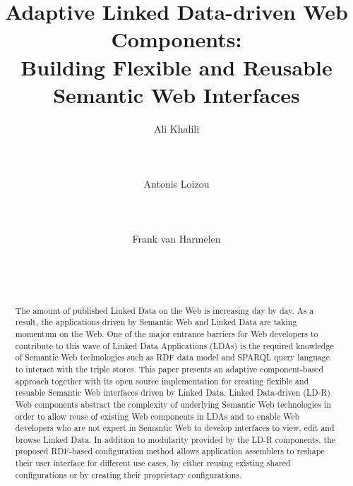 \documentclass{acm_proc_article-sp}
\begin{document}
\title{Adaptive Linked Data-driven Web Components:\\ Building Flexible and Reusable Semantic Web Interfaces}
\subtitle{}

\author{
\alignauthor
Ali Khalili\\
       \\
       \\
       \\
\alignauthor
Antonis Loizou\\
       \\
       \\
       \\
\alignauthor
Frank van Harmelen\\
       \\
       \\
       \\
}


\maketitle
\begin{abstract}
The amount of published Linked Data on the Web is increasing day by day.
As a result, the applications driven by Semantic Web and Linked Data are taking momentum on the Web.
One of the major entrance barriers for Web developers to contribute to this wave of Linked Data Applications (LDAs) is the required knowledge of Semantic Web technologies such as RDF data model and SPARQL query language to interact with the triple stores.
This paper presents an adaptive component-based approach together with its open source implementation for creating flexible and resuable Semantic Web interfaces driven by Linked Data.
Linked Data-driven (LD-R) Web components abstract the complexity of underlying Semantic Web technologies in order to allow reuse of existing Web components in LDAs and to enable Web developers who are not expert in Semantic Web to develop interfaces to view, edit and browse Linked Data.
In addition to modularity provided by the LD-R components, the proposed RDF-based configuration method allows application assemblers to reshape their user interface for different use cases, by either reusing existing shared configurations or by creating their proprietary configurations.

\end{abstract}
\end{document}

